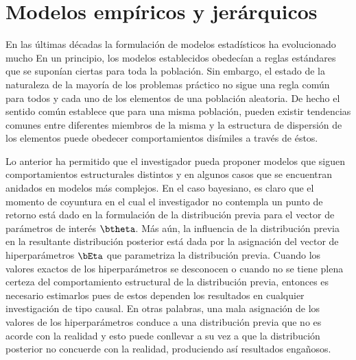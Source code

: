 
 
\chapter{Modelos empíricos y jerárquicos}

En las últimas décadas la formulación de modelos estadísticos ha evolucionado mucho En un principio, los modelos establecidos obedecían a reglas estándares que se suponían ciertas para toda la población. Sin embargo, el estado de la naturaleza de la mayoría de los problemas práctico no sigue una regla común para todos y cada uno de los elementos de una población aleatoria. De hecho el sentido común establece que para una misma población, pueden existir tendencias comunes entre diferentes miembros de la misma y la estructura de dispersión de los elementos puede obedecer comportamientos disímiles a través de éstos.

Lo anterior ha permitido que el investigador pueda proponer modelos que siguen comportamientos estructurales distintos y en algunos casos que se encuentran anidados en modelos más complejos. En el caso bayesiano, es claro que el momento de coyuntura en el cual el investigador no contempla un punto de retorno está dado en la formulación de la distribución previa para el vector de parámetros de interés $\btheta$. Más aún, la influencia de la distribución previa en la resultante distribución posterior está dada por la asignación del vector de hiperparámetros $\bEta$ que parametriza la distribución previa. Cuando los valores exactos de los hiperparámetros se desconocen o cuando no se tiene plena certeza del comportamiento estructural de la distribución previa, entonces es necesario estimarlos pues de estos dependen los resultados en cualquier investigación de tipo causal. En otras palabras, una mala asignación de los valores de los hiperparámetros conduce a una distribución previa que no es acorde con la realidad y esto puede conllevar a su vez a que la distribución posterior no concuerde con la realidad, produciendo así resultados engañosos.

